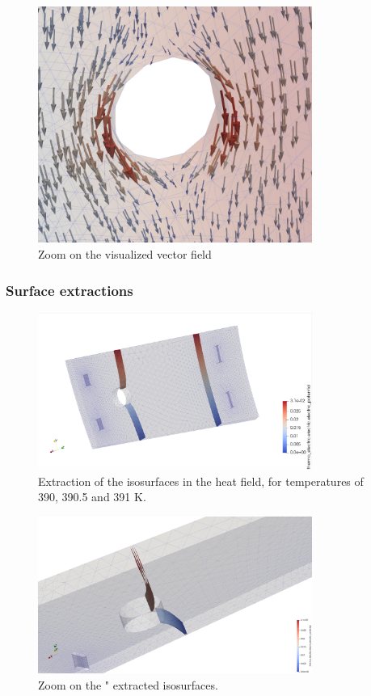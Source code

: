 \documentclass[12pt]{article}
\begin{document}
\begin{figure}
  \centering
  \includegraphics[width=0.8\textwidth]{images/field1_zoom.png}
  \caption{Zoom on the visualized vector field}
\end{figure}

\subsubsection{Surface extractions}

\begin{figure}[H]
  \centering
  \includegraphics[width=0.8\textwidth]{images/isosurfaces.png}
  \caption{Extraction of the isosurfaces in the heat field, for temperatures of 390, 390.5 and 391 K.}
\end{figure}

\begin{figure}[H]
  \centering
  \includegraphics[width=0.8\textwidth]{images/isosurfaces_zoom.png}
  \caption{Zoom on the " extracted isosurfaces.}
\end{figure}
\end{document}
